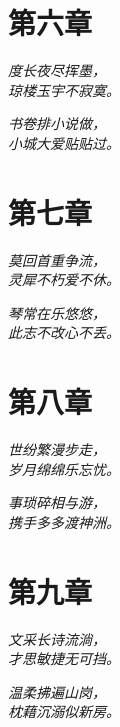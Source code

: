 \documentclass[12pt, a4paper, oneside]{book}
\newenvironment{poem}
  {\vspace{1em}\begin{flushleft}\itshape}
  {\end{flushleft}\vspace{1em}}
\begin{document}
\chapter{第六章}
\begin{poem}
度长夜尽挥墨，\\
琼楼玉宇不寂寞。\\
\end{poem}
\begin{poem}
书卷排小说做，\\
小城大爱贴贴过。\\
\end{poem}

\chapter{第七章}
\begin{poem}
莫回首重争流，\\
灵犀不朽爱不休。\\
\end{poem}
\begin{poem}
琴常在乐悠悠，\\
此志不改心不丢。\\
\end{poem}

\chapter{第八章}
\begin{poem}
世纷繁漫步走，\\
岁月绵绵乐忘忧。\\
\end{poem}
\begin{poem}
事琐碎相与游，\\
携手多多渡神洲。\\
\end{poem}

\chapter{第九章}
\begin{poem}
文采长诗流淌，\\
才思敏捷无可挡。\\
\end{poem}
\begin{poem}
温柔拂遍山岗，\\
枕藉沉溺似新房。\\
\end{poem}
\end{document}
